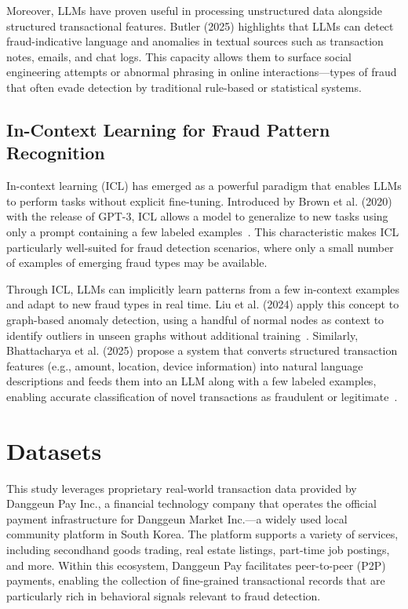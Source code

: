 \documentclass[sigconf]{acmart}
\begin{document}
Moreover, LLMs have proven useful in processing unstructured data alongside structured transactional features. Butler (2025) highlights that LLMs can detect fraud-indicative language and anomalies in textual sources such as transaction notes, emails, and chat logs. This capacity allows them to surface social engineering attempts or abnormal phrasing in online interactions—types of fraud that often evade detection by traditional rule-based or statistical systems.


\subsection{In-Context Learning for Fraud Pattern Recognition}
In-context learning (ICL) has emerged as a powerful paradigm that enables LLMs to perform tasks without explicit fine-tuning. Introduced by Brown et al. (2020) with the release of GPT-3, ICL allows a model to generalize to new tasks using only a prompt containing a few labeled examples~\cite{brown2020llm_fewshot}. This characteristic makes ICL particularly well-suited for fraud detection scenarios, where only a small number of examples of emerging fraud types may be available.

Through ICL, LLMs can implicitly learn patterns from a few in-context examples and adapt to new fraud types in real time. Liu et al. (2024) apply this concept to graph-based anomaly detection, using a handful of normal nodes as context to identify outliers in unseen graphs without additional training~\cite{liu2024anomaly}. Similarly, Bhattacharya et al. (2025) propose a system that converts structured transaction features (e.g., amount, location, device information) into natural language descriptions and feeds them into an LLM along with a few labeled examples, enabling accurate classification of novel transactions as fraudulent or legitimate~\cite{bhattacharya2024fraud}.



\section{Datasets}\label{datasets}
This study leverages proprietary real-world transaction data provided by Danggeun Pay Inc., a financial technology company that operates the official payment infrastructure for Danggeun Market Inc.—a widely used local community platform in South Korea. The platform supports a variety of services, including secondhand goods trading, real estate listings, part-time job postings, and more. Within this ecosystem, Danggeun Pay facilitates peer-to-peer (P2P) payments, enabling the collection of fine-grained transactional records that are particularly rich in behavioral signals relevant to fraud detection.
\end{document}
